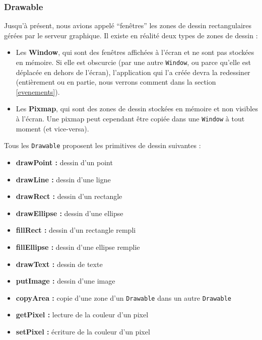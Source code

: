 \subsubsection{Drawable}

Jusqu'à présent, nous avions appelé ``fenêtres'' les zones de dessin rectangulaires gérées par le serveur graphique. Il existe en réalité deux types de zones de dessin :
\begin{itemize}
  \item Les \textbf{Window}, qui sont des fenêtres affichées à l'écran et ne sont pas stockées en mémoire. Si elle est obscurcie (par une autre \verb|Window|, ou parce qu'elle est déplacée en dehors de l'écran), l'application qui l'a créée devra la redessiner (entièrement ou en partie, nous verrons comment dans la section \ref{evenements}).
  \item Les \textbf{Pixmap}, qui sont des zones de dessin stockées en mémoire et non visibles à l'écran. Une pixmap peut cependant être copiée dans une \verb|Window| à tout moment (et vice-versa).
\end{itemize}

\vspace{1em}

Tous les \verb|Drawable| proposent les primitives de dessin suivantes :
\begin{itemize}
  \item \textbf{drawPoint :} dessin d'un point
  \item \textbf{drawLine :} dessin d'une ligne
  \item \textbf{drawRect :} dessin d'un rectangle
  \item \textbf{drawEllipse :} dessin d'une ellipse
  \item \textbf{fillRect :} dessin d'un rectangle rempli
  \item \textbf{fillEllipse :} dessin d'une ellipse remplie
  \item \textbf{drawText :} dessin de texte
  \item \textbf{putImage :} dessin d'une image
  \item \textbf{copyArea :} copie d'une zone d'un \verb|Drawable| dans un autre \verb|Drawable|
  \item \textbf{getPixel :} lecture de la couleur d'un pixel
  \item \textbf{setPixel :} écriture de la couleur d'un pixel
\end{itemize}

\vspace{1em}

